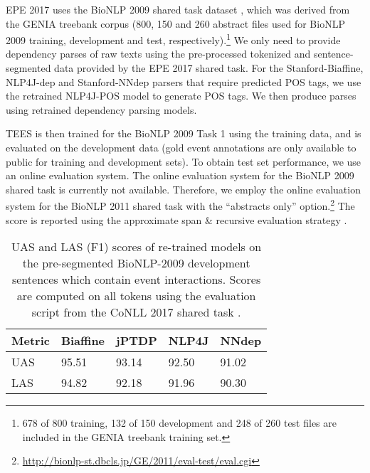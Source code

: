 \documentclass[twocolumn,hyperref]{bmcart}\pdfoutput=1
\newcommand{\CHANGEA}[1]{#1}
\begin{document}
EPE 2017  uses the BioNLP 2009  shared task dataset \cite{BioNLP2009}, which was derived   from  the GENIA treebank corpus (800, 150 and 260 abstract files used for BioNLP 2009 training, development and test, respectively).\footnote{678 of 800 training,  132 of  150 development and 248 of 260 test files are included in the GENIA treebank training set.}  
We only need to provide dependency parses of raw texts using the pre-processed tokenized and sentence-segmented data provided by the EPE 2017 shared task. For the Stanford-Biaffine, NLP4J-dep and Stanford-NNdep parsers that require predicted POS tags, we  use the retrained NLP4J-POS model  to generate POS tags.  We then produce parses using retrained dependency parsing models.


TEES is then trained for the BioNLP 2009 Task 1 using the training data, and is  evaluated on the development data (gold event annotations are only available to public for training and development sets). To obtain test set performance, we use an  online evaluation system. 
The online evaluation system for the BioNLP 2009 shared task is currently not available. Therefore, we employ the online evaluation system for the BioNLP 2011 shared task \cite{kim-EtAl:2011:BioNLP-ST1}   with the ``abstracts only'' option.\footnote{\url{http://bionlp-st.dbcls.jp/GE/2011/eval-test/eval.cgi}}  \CHANGEA{The score is reported using the approximate span \& recursive evaluation strategy \cite{BioNLP2009}.}

 \begin{table}[!t]
     \caption{UAS and LAS (F1) scores of re-trained models on the pre-segmented BioNLP-2009 development sentences  which contain event interactions. Scores  are computed on all tokens using the evaluation script from the CoNLL 2017 shared task   .} 
    \centering
    \begin{tabular}{l|llll}
    \hline
       Metric  & Biaffine  & jPTDP  & NLP4J  & NNdep \\
       \hline 
        UAS & 95.51 & 93.14 & 92.50 & 91.02 \\
        LAS & 94.82 & 92.18 & 91.96 & 90.30 \\
        \hline
    \end{tabular}

    \label{tab:devscores}
\end{table}
\end{document}
